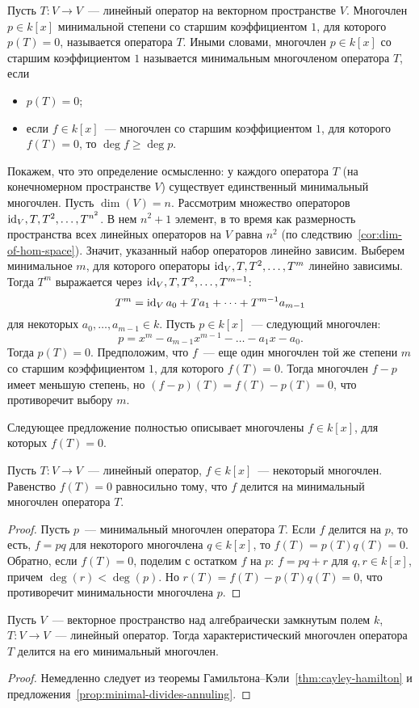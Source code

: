 \begin{definition}\label{dfn:minimal-polynomial}
Пусть $T\colon V\to V$~--- линейный оператор на векторном пространстве $V$.
Многочлен $p\in k[x]$ минимальной степени со старшим коэффициентом $1$,
для которого $p(T)=0$, называется  оператора $T$.
Иными словами, многочлен $p\in k[x]$ со старшим коэффициентом $1$ называется
минимальным многочленом оператора $T$, если
\begin{itemize}
\item $p(T)=0$;
\item если $f\in k[x]$~--- многочлен со старшим коэффициентом $1$, для
которого $f(T)=0$, то $\deg f\geq \deg p$.
\end{itemize}
\end{definition}

Покажем, что это определение осмысленно: у каждого оператора $T$
(на конечномерном пространстве $V$) существует единственный
минимальный многочлен. Пусть $\dim(V)=n$.
Рассмотрим множество операторов $\operatorname{id}_V,T,T^2,\dots,T^{n^2}$. В нем
$n^2+1$ элемент, в то время как размерность пространства всех
линейных операторов на $V$ равна $n^2$
(по следствию~\ref{cor:dim-of-hom-space}). Значит, указанный набор
операторов линейно зависим. Выберем минимальное $m$, для которого
операторы $\operatorname{id}_V,T,T^2,\dots,T^m$ линейно зависимы. Тогда
$T^m$ выражается через $\operatorname{id}_V,T,T^2,\dots,T^{m-1}$:
$$
T^m = \operatorname{id}_V a_0 + Ta_1 + \dots + T^{m-1}a_{m-1}
$$
для некоторых $a_0,\dots,a_{m-1}\in k$.
Пусть $p\in k[x]$~--- следующий многочлен:
$$
p = x^m - a_{m-1}x^{m-1} - \dots - a_1x - a_0.
$$
Тогда $p(T)=0$. Предположим, что $f$~--- еще один многочлен той же степени
$m$ со старшим коэффициентом $1$, для которого $f(T)=0$.
Тогда многочлен $f-p$ имеет меньшую степень, но
$(f-p)(T) = f(T) - p(T) = 0$, что противоречит выбору $m$.

Следующее предложение полностью описывает многочлены $f\in k[x]$, для которых
$f(T) = 0$.
\begin{proposition}\label{prop:minimal-divides-annuling}
Пусть $T\colon V\to V$~--- линейный оператор, $f\in k[x]$~--- некоторый
многочлен.
Равенство $f(T)=0$ равносильно тому, что $f$ делится на минимальный
многочлен оператора $T$.
\end{proposition}
\begin{proof}
Пусть $p$~--- минимальный многочлен оператора $T$. Если $f$ делится на $p$,
то есть, $f=pq$ для некоторого многочлена $q\in k[x]$,
то $f(T) = p(T)q(T) = 0$.
Обратно, если $f(T)=0$, поделим с остатком $f$ на $p$:
$f = pq+r$ для $q,r\in k[x]$, причем $\deg(r) < \deg(p)$.
Но $r(T) = f(T)-p(T)q(T) = 0$, что противоречит минимальности
многочлена $p$.
\end{proof}
\begin{corollary}
Пусть $V$~--- векторное пространство над алгебраически замкнутым полем $k$,
$T\colon V\to V$~--- линейный оператор.
Тогда характеристический многочлен оператора $T$ делится на его
минимальный многочлен.
\end{corollary}
\begin{proof}
Немедленно следует из теоремы Гамильтона--Кэли~\ref{thm:cayley-hamilton}
и предложения~\ref{prop:minimal-divides-annuling}.
\end{proof}

